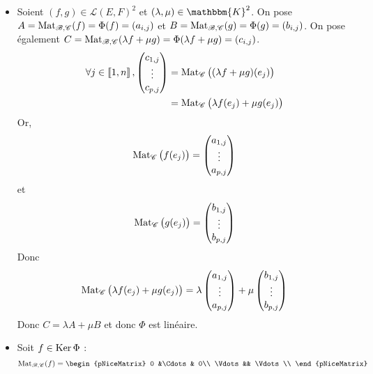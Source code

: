 \begin{prv}
	\begin{itemize}
		\item Soient $(f,g) \in \mathcal{L}(E,F)^2$ et $(\lambda, \mu) \in \mathbbm{K}^2$. On pose $A = \operatorname{Mat}_{\mathcal{B},\mathcal{C}}(f) = \Phi(f) = (a_{i,j})$ et $B = \operatorname{Mat}_{\mathcal{B},\mathcal{C}}(g) = \Phi(g) = (b_{i,j})$. On pose également $C = \operatorname{Mat}_{\mathcal{B}, \mathcal{C}}(\lambda f + \mu g) = \Phi(\lambda f + \mu g) = (c_{i,j})$.
			\begin{align*}
				\forall j \in \left\llbracket 1,n \right\rrbracket, \begin{pmatrix}
					c_{1,j}\\
					\vdots\\
					c_{p,j}
				\end{pmatrix} &= \operatorname{Mat}_{\mathcal{C}}\big((\lambda f + \mu g)(e_j)\big)\\
					&= \operatorname{Mat}_{\mathcal{C}}\big(\lambda f(e_j) + \mu g(e_j)\big) \\
			\end{align*}
			Or, \[
				\operatorname{Mat}_{\mathcal{C}}\big(f(e_j)\big)  = \begin{pmatrix}
					a_{1,j}\\
					\vdots\\
					a_{p,j}
				\end{pmatrix}
			\] et \[
				\operatorname{Mat}_{\mathcal{C}}\big(g(e_j)\big) = \begin{pmatrix}
					b_{1,j}\\
					\vdots\\
					b_{p,j}
				\end{pmatrix} 
			\] Donc \[
				\operatorname{Mat}_\mathcal{C} \big(\lambda f(e_j) + \mu g(e_j)\big) = \lambda \begin{pmatrix}
					a_{1,j}\\
					\vdots\\
					a_{p,j}
				\end{pmatrix} + \mu \begin{pmatrix}
					b_{1,j}\\
					\vdots\\
					b_{p,j}
				\end{pmatrix}
			\] Donc $C = \lambda A + \mu B$ et donc $\Phi$ est linéaire.
		\item Soit $f \in \operatorname{Ker}\Phi$ : \[
				\Mat_{\mathcal{B},\mathcal{C}}(f) =
				\begin{pNiceMatrix}
					0 &\Cdots& 0\\
					\Vdots && \Vdots\\

\end{pNiceMatrix}\]
\end{itemize}
\end{prv}
